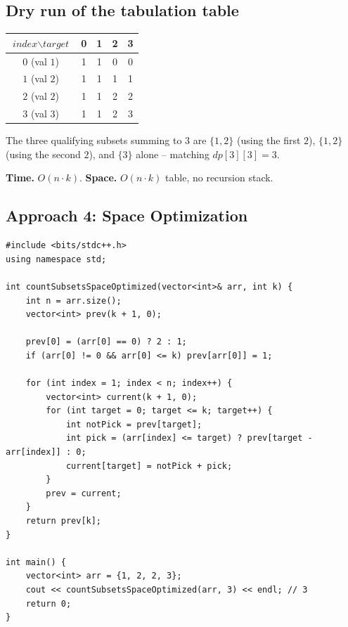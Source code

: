 \subsection*{Dry run of the tabulation table}


\begin{center}
\begin{tabular}{c|c|c|c|c}
$\textit{index}\backslash\textit{target}$ & 0 & 1 & 2 & 3 \\ \hline
$0$ (val $1$) & 1 & 1 & 0 & 0 \\
$1$ (val $2$) & 1 & 1 & 1 & 1 \\
$2$ (val $2$) & 1 & 1 & 2 & 2 \\
$3$ (val $3$) & 1 & 1 & 2 & 3
\end{tabular}
\end{center}

The three qualifying subsets summing to $3$ are $\{1,2\}$ (using the
first $2$), $\{1,2\}$ (using the second $2$), and $\{3\}$ alone --
matching $\textit{dp}[3][3]=3$.

\begin{complexitybox}
\textbf{Time.} $O(n \cdot k)$.
\textbf{Space.} $O(n \cdot k)$ table, no recursion stack.
\end{complexitybox}

\subsection*{Approach 4: Space Optimization}

\begin{lstlisting}
#include <bits/stdc++.h>
using namespace std;

int countSubsetsSpaceOptimized(vector<int>& arr, int k) {
    int n = arr.size();
    vector<int> prev(k + 1, 0);

    prev[0] = (arr[0] == 0) ? 2 : 1;
    if (arr[0] != 0 && arr[0] <= k) prev[arr[0]] = 1;

    for (int index = 1; index < n; index++) {
        vector<int> current(k + 1, 0);
        for (int target = 0; target <= k; target++) {
            int notPick = prev[target];
            int pick = (arr[index] <= target) ? prev[target - arr[index]] : 0;
            current[target] = notPick + pick;
        }
        prev = current;
    }
    return prev[k];
}

int main() {
    vector<int> arr = {1, 2, 2, 3};
    cout << countSubsetsSpaceOptimized(arr, 3) << endl; // 3
    return 0;
}
\end{lstlisting}

